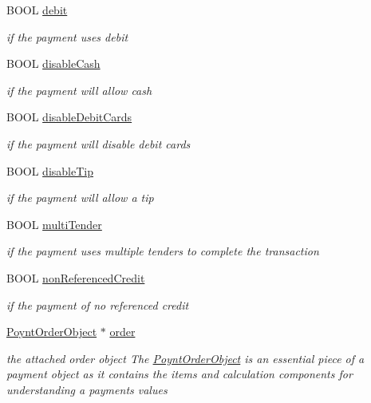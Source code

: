 \begin{DoxyCompactItemize}
B\+O\+OL \hyperlink{interface_poynt_payment_object_a76dfb16e254da2dd51a3269700a40581}{debit}
\begin{DoxyCompactList}\small\item\em if the payment uses debit \end{DoxyCompactList}\item 
B\+O\+OL \hyperlink{interface_poynt_payment_object_af4d70322e9072299e80fa78a54e7094e}{disable\+Cash}
\begin{DoxyCompactList}\small\item\em if the payment will allow cash \end{DoxyCompactList}\item 
B\+O\+OL \hyperlink{interface_poynt_payment_object_a3f9d08fa34a1f60c5818a7b570d8b41f}{disable\+Debit\+Cards}
\begin{DoxyCompactList}\small\item\em if the payment will disable debit cards \end{DoxyCompactList}\item 
B\+O\+OL \hyperlink{interface_poynt_payment_object_a7b291056797beff707e48865aefe7c5a}{disable\+Tip}
\begin{DoxyCompactList}\small\item\em if the payment will allow a tip \end{DoxyCompactList}\item 
B\+O\+OL \hyperlink{interface_poynt_payment_object_a42f2647ecd1d090fad6a7b77e28ee013}{multi\+Tender}
\begin{DoxyCompactList}\small\item\em if the payment uses multiple tenders to complete the transaction \end{DoxyCompactList}\item 
B\+O\+OL \hyperlink{interface_poynt_payment_object_a84b5ff3701d66e70a3bb2485d4e99a3b}{non\+Referenced\+Credit}
\begin{DoxyCompactList}\small\item\em if the payment of no referenced credit \end{DoxyCompactList}\item 
\hyperlink{interface_poynt_order_object}{Poynt\+Order\+Object} $\ast$ \hyperlink{interface_poynt_payment_object_a570f3f5a3eb312987a97d46c0ba10a9d}{order}
\begin{DoxyCompactList}\small\item\em the attached order object  The \hyperlink{interface_poynt_order_object}{Poynt\+Order\+Object} is an essential piece of a payment object as it contains the items and calculation components for understanding a payments values \end{DoxyCompactList}\item 

\end{DoxyCompactItemize}
